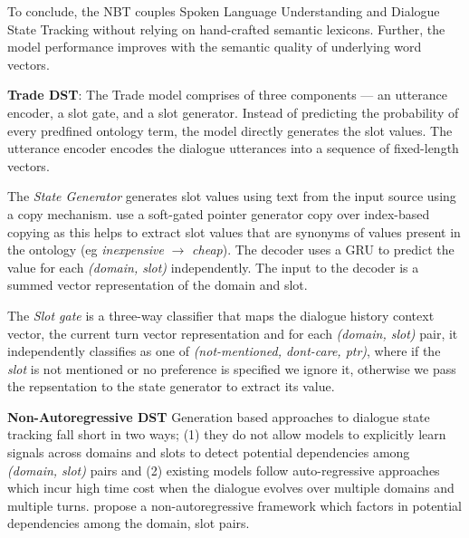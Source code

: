 \documentclass[12pt,a4paper]{article}
\begin{document}
To conclude, the NBT couples Spoken Language Understanding and Dialogue State Tracking without relying on hand-crafted semantic lexicons. Further, the model performance improves with the semantic quality of underlying word vectors.

\medskip \noindent \textbf{Trade DST}: The Trade model \cite{WuTradeDST2019} comprises of three components --- an utterance encoder, a slot gate, and a slot generator. Instead of predicting the probability of every predfined ontology term, the model directly generates the slot values. The utterance encoder encodes the dialogue utterances into a sequence of fixed-length vectors.

The \textit{State Generator} generates slot values using text from the input source using a copy mechanism. \citeauthor{WuTradeDST2019} use a soft-gated pointer generator copy over index-based copying as this helps to extract slot values that are synonyms of values present in the ontology (eg \textit{inexpensive} $\rightarrow$ \textit{cheap}). The decoder uses a GRU to predict the value for each \textit{(domain, slot)} independently. The input to the decoder is a summed vector representation of the domain and slot.

The \textit{Slot gate} is a three-way classifier that maps the dialogue history context vector, the current turn vector representation and for each \textit{(domain, slot)} pair, it independently classifies as one of \textit{(not-mentioned, dont-care, ptr)}, where if the \textit{slot} is not mentioned or no preference is specified we ignore it, otherwise we pass the repsentation to the state generator to extract its value.


\medskip \noindent \textbf{Non-Autoregressive DST} Generation based approaches to dialogue state tracking fall short in two ways; (1) they do not allow models to explicitly learn signals across domains and slots to detect potential dependencies among \textit{(domain, slot)} pairs and (2) existing models follow auto-regressive approaches which incur high time cost when the dialogue evolves over multiple domains and multiple turns. \citeauthor{Le2020NonAutoregressiveDS} propose a non-autoregressive framework which factors in potential dependencies among the domain, slot pairs.
\end{document}

